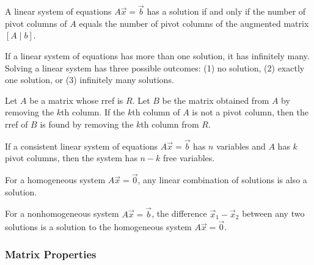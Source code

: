 \begin{theorem} \label{pivot columns iff} \label{thm solution iff augmented not pivot}
A linear system of equations $A\vec x=\vec b$ has a solution if and only if the number of pivot columns of $A$ equals the number of pivot columns of the augmented matrix $[A\mid b]$.
\end{theorem}

\begin{theorem}\label{thm no, one, or infinitely many solutions}
If a linear system of equations has more than one solution, it has infinitely many.  Solving a linear system has three possible outcomes: (1) no solution, (2) exactly one solution, or (3) infinitely many solutions. 
\end{theorem}

\begin{theorem} Let $A$ be a matrix whose rref is $R$.  Let $B$ be the matrix obtained from $A$ by removing the $k$th column.  If the $k$th column of $A$ is not a pivot column, then the rref of $B$ is found by removing the $k$th column from $R$. 
\end{theorem}

\begin{theorem}\label{thm n-k free variables}
If a consistent linear system of equations $A\vec x=\vec b$ has $n$ variables and $A$ has $k$ pivot columns, then the system has $n-k$ free variables. 
\end{theorem}

\begin{theorem} \label{thm superposition}\label{thm homogeneous}
For a homogeneous system $A\vec x = \vec 0$, any linear combination of solutions is also a solution.
\end{theorem}

\begin{theorem}\label{thm nonhomogeneous}
For a nonhomogeneous system $A\vec x=\vec b$, the difference $\vec x_1-\vec x_2$ between any two solutions is a solution to the homogeneous system $A\vec x=\vec 0$. 
\end{theorem}





\subsubsection{Matrix Properties}

